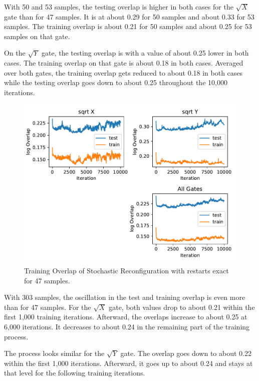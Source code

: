 With 50 and 53 samples, the testing overlap is higher in both cases for the $\sqrt{X}$ gate than for 
47 samples. It is at about 0.29 for 50 samples and about 0.33 for 53 samples. The training overlap is about 
0.21 for 50 samples and about 0.25 for 53 samples on that gate.

On the $\sqrt{Y}$ gate, the testing overlap is with a value of about 0.25 lower in both cases. The 
training overlap on that gate is about 0.18 in both cases. Averaged over both gates, the training 
overlap gets reduced to about 0.18 in both cases while the testing overlap goes down to about 0.25 
throughout the 10,000 iterations.

\begin{figure}[H]
  \centering
  \includegraphics[width=\textwidth]{figures/results/SR-restarts-not-learned/avgOverlap_47.pdf}
  \caption[Training and Testing Overlaps for Stochastic Reconfiguration with Random Restarts and $CZ$ Gates Applied Exactly - 47 Samples]{Training 
  Overlap of Stochastic Reconfiguration with restarts exact for 47 samples.}
  \label{fig:sr_exact_overlap_47}
\end{figure}

With 303 samples, the oscillation in the test and training overlap is even more than for 47 samples. 
For the $\sqrt{X}$ gate, both values drop to about 0.21 within the first 1,000 training iterations. 
Afterward, the overlaps increase to about 0.25 at 6,000 iterations. It decreases to about 0.24 in the 
remaining part of the training process.

The process looks similar for the $\sqrt{Y}$ gate. The overlap goes down to about 0.22 within the 
first 1,000 iterations. Afterward, it goes up to about 0.24 and stays at that level for the 
following training iterations.

